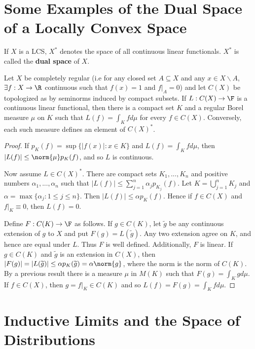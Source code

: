 \section{Some Examples of the Dual Space of a Locally Convex Space}
\label{sec:dualLocConv}

If $X$ is a LCS, $X^*$ denotes the space of all continuous linear functionals. $X^*$ is called the \textbf{dual space} of $X$.

\begin{prop}
    Let $X$ be completely regular (i.e for any closed set $A \subseteq X$ and any $x \in X\backslash A$, $\exists f:X\rightarrow \R$ continuous such that $f(x) = 1$ and $f\vert_A = 0$) and let $C(X)$ be topologized as by seminorms induced by compact subsets. If $L:C(X)\rightarrow \F$ is a continuous linear functional, then there is a compact set $K$ and a regular Borel measure $\mu$ on $K$ such that $L(f) = \int_Kfd\mu$ for every $f \in C(X)$. Conversely, each such measure defines an element of $C(X)^*$.
\end{prop}
\begin{proof}
    If $p_K(f) = \sup\{|f(x)|:x \in K\}$ and $L(f) = \int_Kfd\mu$, then $|L(f)| \leq \norm{\mu}p_K(f)$, and so $L$ is continuous.

    Now assume $L \in C(X)^*$. There are compact sets $K_1,...,K_n$ and positive numbers $\alpha_1,...,\alpha_n$ such that $|L(f)|\leq \sum_{j=1}^n\alpha_jp_{K_j}(f)$. Let $K = \bigcup_{j=1}^nK_j$ and $\alpha = \max\{\alpha_j:1\leq j \leq n\}$. Then $|L(f)| \leq \alpha p_K(f)$. Hence if $f \in C(X)$ and $f\vert_K \equiv 0$, then $L(f) = 0$.

    Define $F:C(K)\rightarrow \F$ as follows. If $g \in C(K)$, let $\widetilde{g}$ be any continuous extension of $g$ to $X$ and put $F(g) = L(\widetilde{g})$. Any two extension agree on $K$, and hence are equal under $L$. Thus $F$ is well defined. Additionally, $F$ is linear. If $g \in C(K)$ and $\widetilde{g}$ is an extension in $C(X)$, then $|F(g)| = |L(\widetilde{g})| \leq \alpha p_K(\widetilde{g}) = \alpha\norm{g}$, where the norm is the norm of $C(K)$. By a previous result there is a measure $\mu$ in $M(K)$ such that $F(g) = \int_Kgd\mu$. If $f \in C(X)$, then $g = f\vert_K \in C(K)$ and so $L(f) = F(g) = \int_Kfd\mu$.
\end{proof}



\section{Inductive Limits and the Space of Distributions}
\label{sec:indLim}





